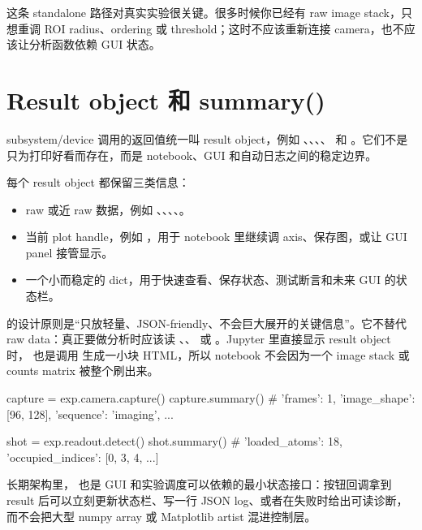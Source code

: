 \documentclass[11pt,oneside,openany]{book}
\begin{document}
这条 standalone 路径对真实实验很关键。很多时候你已经有 raw image stack，只想重调 ROI radius、ordering 或 threshold；这时不应该重新连接 camera，也不应该让分析函数依赖 GUI 状态。

\section{Result object 和 summary()}
subsystem/device 调用的返回值统一叫 result object，例如 、、、、 和 。它们不是只为打印好看而存在，而是 notebook、GUI 和自动日志之间的稳定边界。

每个 result object 都保留三类信息：
\begin{itemize}
  \item raw 或近 raw 数据，例如 、、、、。
  \item 当前 plot handle，例如 ，用于 notebook 里继续调 axis、保存图，或让 GUI panel 接管显示。
  \item 一个小而稳定的  dict，用于快速查看、保存状态、测试断言和未来 GUI 的状态栏。
\end{itemize}

 的设计原则是“只放轻量、JSON-friendly、不会巨大展开的关键信息”。它不替代 raw data：真正要做分析时应该读 、、 或 。Jupyter 里直接显示 result object 时， 也是调用  生成一小块 HTML，所以 notebook 不会因为一个 image stack 或 counts matrix 被整个刷出来。

\begin{codeblock}[Python]
capture = exp.camera.capture()
capture.summary()
# {'frames': 1, 'image_shape': [96, 128], 'sequence': 'imaging', ...}

shot = exp.readout.detect()
shot.summary()
# {'loaded_atoms': 18, 'occupied_indices': [0, 3, 4, ...]}
\end{codeblock}

长期架构里， 也是 GUI 和实验调度可以依赖的最小状态接口：按钮回调拿到 result 后可以立刻更新状态栏、写一行 JSON log、或者在失败时给出可读诊断，而不会把大型 numpy array 或 Matplotlib artist 混进控制层。
\end{document}
